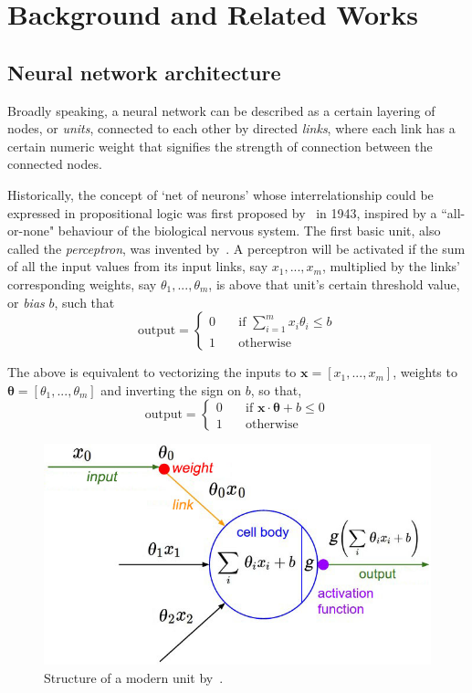 \chapter{Background and Related Works}\label{ch:background}


\section{Neural network architecture}\label{sec:nn-architecture}

Broadly speaking, a neural network can be described as a certain layering of nodes, or \textit{units}, connected to each other by directed \textit{links}, where each link has a certain numeric weight that signifies the strength of connection between the connected nodes. 

Historically, the concept of `net of neurons' whose interrelationship could be expressed in propositional logic was first proposed by~\cite{McDPit43} in 1943, inspired by a ``all-or-none" behaviour of the biological nervous system. The first basic unit, also called the \textit{perceptron}, was invented by~\cite{Ros62}. A perceptron will be activated if the sum of all the input values from its input links, say $x_1,..., x_m$, multiplied by the links' corresponding weights, say $\theta_1,..., \theta_m$, is above that unit's certain threshold value, or \textit{bias} $b$, such that
\[ \text{output} = 
   \begin{cases}
   0 & \quad \text{if } \displaystyle\sum_{i=1}^{m} x_i \theta_i \leq b\\
   1 & \quad \text{otherwise }
   \end{cases}
\]

The above is equivalent to vectorizing the inputs to $\boldsymbol{x} = [x_1,...,x_m]$, weights to $\boldsymbol{\theta} = [\theta_1,...,\theta_m]$ and inverting the sign on $b$, so that,
\[ \text{output} = 
   \begin{cases}
     0	& \quad \text{if } \boldsymbol{x} \cdot \boldsymbol{\theta} + b \leq 0\\
     1	& \quad \text{otherwise }
   \end{cases}
\]

\begin{figure}
  \centerline{\includegraphics[width=0.7\linewidth]{neuron_model.jpg}}
  \caption{Structure of a modern unit by~\cite{Kar16}.}
  \label{fig:neuron}
\end{figure}


